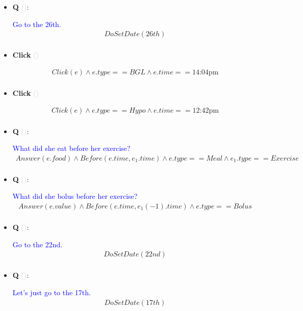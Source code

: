 \documentclass[11pt]{article}
\newcounter{CQ}
\newcounter{CClick}
\newcommand{\key}[1]{\textcolor{lightgray}{#1}}
\begin{document}
\begin{itemize}
	
	\item
	\textbf{Q\theCQ} \key{()}: \addtocounter{CQ}{1}
	\textcolor{blue}{ Go to the 26th. }
	\begin{multline*}
	DoSetDate(26th) \\
	\end{multline*}
	
	
	\item
	\textbf{Click\theCClick} \key{()} \addtocounter{CClick}{1}
	\begin{multline*}
	Click(e) \wedge e.type == BGL \wedge e.time == \mbox{14:04pm} \\
	\end{multline*}
	
	\item
	\textbf{Click\theCClick} \key{()} \addtocounter{CClick}{1}
	\begin{multline*}
	Click(e) \wedge e.type == Hypo \wedge e.time == \mbox{12:42pm} \\
	\end{multline*}
	
	
	\item
	\textbf{Q\theCQ} \key{()}: \addtocounter{CQ}{1}
	\textcolor{blue}{ What did she eat before her exercise? }
	\begin{multline*}
	 Answer(e.food) \wedge Before(e.time, e_1.time) \wedge e.type==Meal \wedge e_1.type==Exercise  \\
	\end{multline*}
	
	
	\item
	\textbf{Q\theCQ} \key{()}: \addtocounter{CQ}{1}
	\textcolor{blue}{ What did she bolus before her exercise? }
	\begin{multline*}
	 Answer(e.value) \wedge Before(e.time, e_1(-1).time) \wedge e.type==Bolus \\
	\end{multline*}
	

	\item
	\textbf{Q\theCQ} \key{()}: \addtocounter{CQ}{1}
	\textcolor{blue}{ Go to the 22nd. }
	\begin{multline*}
	DoSetDate(22nd) \\
	\end{multline*}
	
	
	\item
	\textbf{Q\theCQ} \key{()}: \addtocounter{CQ}{1}
	\textcolor{blue}{ Let's just go to the 17th. }
	\begin{multline*}
	DoSetDate(17th) \\
	\end{multline*}
	


\end{itemize}
\end{document}
